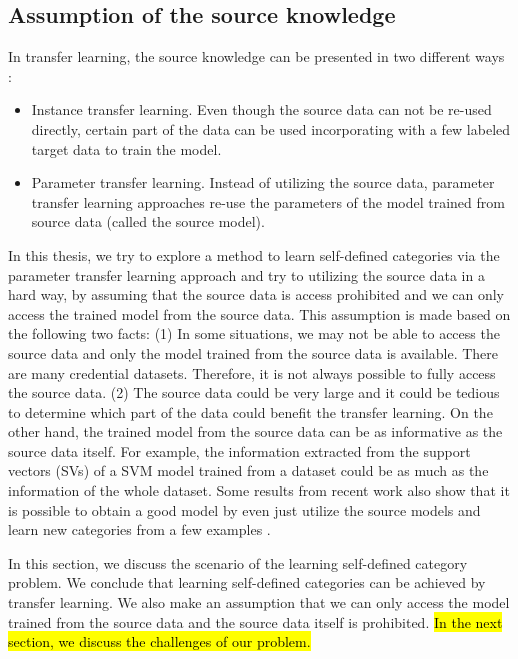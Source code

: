 \subsection{Assumption of the source knowledge}
In transfer learning, the source knowledge can be presented in two different ways \cite{pan2010survey}: 
\begin{itemize}
	\item Instance transfer learning. Even though the source data can not be re-used directly, certain part of the data can be used incorporating with a few labeled target data to train the model.
	\item Parameter transfer learning. Instead of utilizing the source data, parameter transfer learning approaches re-use the parameters of the model trained from source data (called the source model). 
\end{itemize}

In this thesis, we try to explore a method to learn self-defined categories via the parameter transfer learning approach and try to utilizing the source data in a hard way, by assuming that the source data is access prohibited and we can only access the trained model from the source data.
This assumption is made based on the following two facts: (1) In some situations, we may not be able to access the source data and only the model trained from the source data is available. There are many credential datasets. Therefore, it is not always possible to fully access the source data. (2) The source data could be very large and it could be tedious to determine which part of the data could benefit the transfer learning. On the other hand, the trained model from the source data can be as informative as the source data itself. For example, the information extracted from the support vectors (SVs) of a SVM model trained from a dataset could be as much as the information of the whole dataset. Some results from recent work also show that it is possible to obtain a good model by even just utilize the source models and learn new categories from a few examples \cite{fei2006one} \cite{tommasi2010safety} \cite{tommasi2014learning}.

In this section, we discuss the scenario of the learning self-defined category problem. We conclude that learning self-defined categories can be achieved by transfer learning. We also make an assumption that we can only access the model trained from the source data and the source data itself is prohibited. \hl{In the next section, we discuss the challenges of our problem.}

